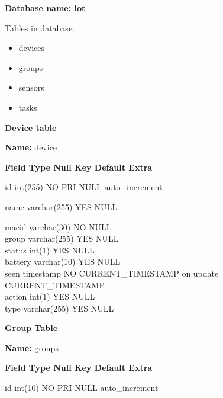 \documentclass[16pt]{article}
\begin{document}
\textbf{Database name: iot}

Tables in database: 

\begin{itemize}

\item devices
\item groups 
\item sensors
\item tasks  

\end{itemize}

\textbf{Device table}

\textbf{Name:} device

\textbf{\textbar{} Field \textbar{} Type \textbar{} Null \textbar{} Key
\textbar{} Default \textbar{} Extra \textbar{}}

\textbar{} id \textbar{} int(255) \textbar{} NO \textbar{} PRI
\textbar{} NULL \textbar{} auto\_increment \textbar{}

\textbar{} name \textbar{} varchar(255) \textbar{} YES \textbar{}
\textbar{} NULL \textbar{} \textbar{}

\textbar{} macid \textbar{} varchar(30) \textbar{} NO \textbar{}
\textbar{} NULL \textbar{} \textbar{}\\ \textbar{} group \textbar{}
varchar(255) \textbar{} YES \textbar{} \textbar{} NULL \textbar{}
\textbar{}\\ \textbar{} status \textbar{} int(1) \textbar{} YES
\textbar{} \textbar{} NULL \textbar{} \textbar{}\\ \textbar{} battery
\textbar{} varchar(10) \textbar{} YES \textbar{} \textbar{} NULL
\textbar{} \textbar{}\\ \textbar{} seen \textbar{} timestamp \textbar{}
NO \textbar{} \textbar{} CURRENT\_TIMESTAMP \textbar{} on update
CURRENT\_TIMESTAMP \textbar{}\\ \textbar{} action \textbar{} int(1)
\textbar{} YES \textbar{} \textbar{} NULL \textbar{} \textbar{}\\
\textbar{} type \textbar{} varchar(255) \textbar{} YES \textbar{}
\textbar{} NULL \textbar{} \textbar{}

\textbf{Group Table}

\textbf{Name:} groups

\textbf{\textbar{} Field \textbar{} Type \textbar{} Null \textbar{} Key
\textbar{} Default \textbar{} Extra \textbar{}}

id \textbar{} int(10) \textbar{} NO \textbar{} PRI \textbar{} NULL
\textbar{} auto\_increment \textbar{}
\end{document}
